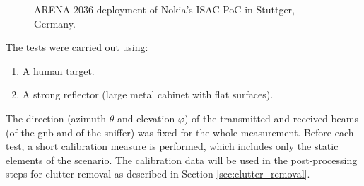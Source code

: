 \begin{figure}[b!]
	\centering
	
	\hfill
	\caption[]{\small ARENA 2036 deployment of Nokia's ISAC PoC in Stuttger, Germany.}
	\label{fig:arena_pics}
\end{figure}

 
The tests were carried out using:

\begin{enumerate}
	\item A human target.
	\item A strong reflector (large metal cabinet with flat surfaces).
\end{enumerate}

The direction (azimuth $\theta$ and elevation $\varphi$) of the transmitted and received beams (\ie of the \gls{gnb} and of the sniffer) was fixed for the whole measurement.
Before each test, a short calibration measure is performed, which includes only the static elements of the scenario. The calibration data will be used in the post-processing steps for clutter removal as described in Section \ref{sec:clutter_removal}.

